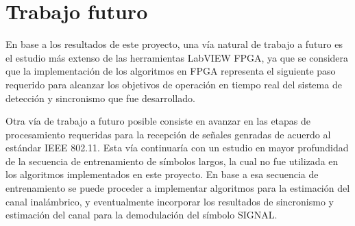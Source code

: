 \section{Trabajo futuro}
\label{S:trabajo-futuro}

En base a los resultados de este proyecto, una vía natural de trabajo a futuro es el estudio más extenso de las herramientas LabVIEW FPGA, ya que se considera que la implementación de los algoritmos en FPGA representa el siguiente paso requerido para alcanzar los objetivos de operación en tiempo real del sistema de detección y sincronismo que fue desarrollado.

Otra vía de trabajo a futuro posible consiste en avanzar en las etapas de procesamiento requeridas para la recepción de señales genradas de acuerdo al estándar IEEE 802.11. Esta vía continuaría con un estudio en mayor profundidad de la secuencia de entrenamiento de símbolos largos, la cual no fue utilizada en los algoritmos implementados en este proyecto. En base a esa secuencia de entrenamiento se puede proceder a implementar algoritmos para la estimación del canal inalámbrico, y eventualmente incorporar los resultados de sincronismo y estimación del canal para la demodulación del símbolo SIGNAL. 